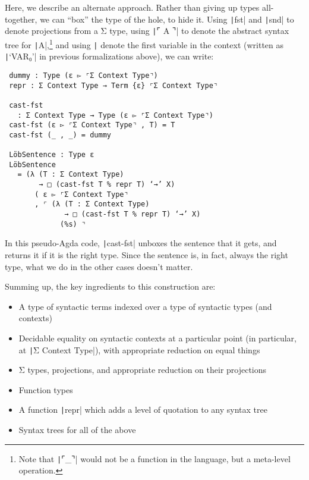   Here, we describe an alternate approach.  Rather than giving up
  types all-together, we can ``box'' the type of the hole, to hide it.
  Using \texttt|fst| and \texttt|snd| to denote
  projections from a Σ type, using \texttt|⌜ A ⌝| to denote
  the abstract syntax tree for \texttt|A|,\footnote{Note
  that \texttt|⌜_⌝| would not be a function in the language,
  but a meta-level operation.} and using \texttt|%
  denote the first variable in the context (written as
  \texttt|‘VAR₀’| in previous formalizations above), we can
  write:

  \begin{verbatim}
 dummy : Type (ε ▻ ⌜Σ Context Type⌝)
 repr : Σ Context Type → Term {ε} ⌜Σ Context Type⌝

 cast-fst
   : Σ Context Type → Type (ε ▻ ⌜Σ Context Type⌝)
 cast-fst (ε ▻ ⌜Σ Context Type⌝ , T) = T
 cast-fst (_ , _) = dummy

 LӧbSentence : Type ε
 LӧbSentence
   = (λ (T : Σ Context Type)
        → □ (cast-fst T % repr T) ‘→’ X)
       ( ε ▻ ⌜Σ Context Type⌝
       , ⌜ (λ (T : Σ Context Type)
              → □ (cast-fst T % repr T) ‘→’ X)
             (%s) ⌝
  \end{verbatim}

  In this pseudo-Agda code, \texttt|cast-fst| unboxes the
  sentence that it gets, and returns it if it is the right type.
  Since the sentence is, in fact, always the right type, what we do in
  the other cases doesn't matter.

  Summing up, the key ingredients to this construction are:
  \begin{itemize}

    \item A type of syntactic terms indexed over a type of syntactic
      types (and contexts)

    \item Decidable equality on syntactic contexts at a particular
      point (in particular, at \texttt|Σ Context Type|),
      with appropriate reduction on equal things

    \item Σ types, projections, and appropriate reduction on their
      projections

    \item Function types

    \item A function \texttt|repr| which adds a level of
      quotation to any syntax tree

    \item Syntax trees for all of the above

  \end{itemize}

